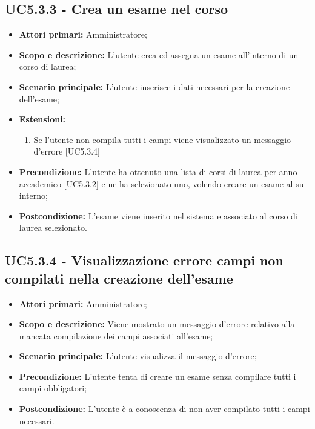 \documentclass[AnalisiDeiRequisiti.tex]{subfiles}
\begin{document}
\subsection{UC5.3.3 - Crea un esame nel corso}
\begin{itemize}
	\item \textbf{Attori primari:} Amministratore;
	\item \textbf{Scopo e descrizione:} L'utente crea ed assegna un esame all'interno di un corso di laurea;
	\item \textbf{Scenario principale:} L'utente inserisce i dati necessari per la creazione dell'esame;
	\item \textbf{Estensioni:}
	\begin{enumerate}
		\item Se l'utente non compila tutti i campi viene visualizzato un messaggio d'errore [UC5.3.4]
	\end{enumerate}
	\item \textbf{Precondizione:} L'utente ha ottenuto una lista di corsi di laurea per anno accademico [UC5.3.2] e ne ha selezionato uno, volendo creare un esame al su interno; 
	\item \textbf{Postcondizione:} L'esame viene inserito nel sistema e associato al corso di laurea selezionato.
\end{itemize}
\subsection{UC5.3.4 - Visualizzazione errore campi non compilati nella creazione dell'esame}
\begin{itemize}
	\item \textbf{Attori primari:} Amministratore;
	\item \textbf{Scopo e descrizione:} Viene mostrato un messaggio d'errore relativo alla mancata compilazione dei campi associati all'esame;
	\item \textbf{Scenario principale:} L'utente visualizza il messaggio d'errore;
	\item \textbf{Precondizione:} L'utente tenta di creare un esame senza compilare tutti i campi obbligatori; 
	\item \textbf{Postcondizione:} L'utente è a conoscenza di non aver compilato tutti i campi necessari.
\end{itemize}
\end{document}
